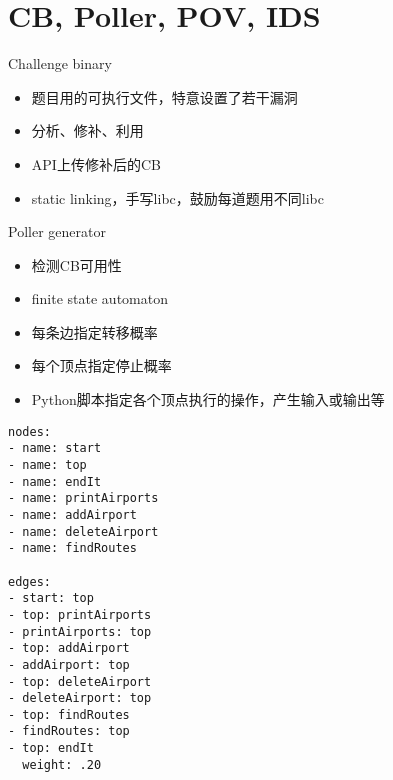 \documentclass{beamer}
\begin{document}
\section{CB, Poller, POV, IDS}

\begin{frame}
  \begin{block}{Challenge binary}
    \begin{itemize}
      \item 题目用的可执行文件，特意设置了若干漏洞
      \item 分析、修补、利用
      \item API上传修补后的CB
      \item static linking，手写libc，鼓励每道题用不同libc
    \end{itemize}
  \end{block}
\end{frame}

\begin{frame}
  \begin{block}{Poller generator}
    \begin{itemize}
      \item 检测CB可用性
      \item finite state automaton
      \item 每条边指定转移概率
      \item 每个顶点指定停止概率
      \item Python脚本指定各个顶点执行的操作，产生输入或输出等
    \end{itemize}
  \end{block}
\end{frame}

\begin{frame}[fragile]{}
  \tiny
  \begin{center}
    \begin{minipage}{0.5\textwidth}
      \begin{verbatim}
nodes:
- name: start
- name: top
- name: endIt
- name: printAirports
- name: addAirport
- name: deleteAirport
- name: findRoutes

edges:
- start: top
- top: printAirports
- printAirports: top
- top: addAirport
- addAirport: top
- top: deleteAirport
- deleteAirport: top
- top: findRoutes
- findRoutes: top
- top: endIt
  weight: .20
      \end{verbatim}
    \end{minipage}
  \end{center}
\end{frame}
\end{document}
